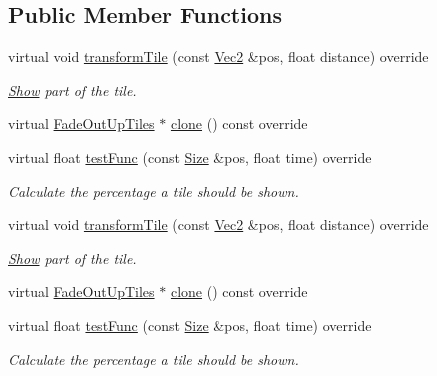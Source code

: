 \subsection*{Public Member Functions}
\begin{DoxyCompactItemize}
\item 
virtual void \hyperlink{classFadeOutUpTiles_a408548b6434137f3be0cb47fe43c2e2d}{transform\+Tile} (const \hyperlink{classVec2}{Vec2} \&pos, float distance) override
\begin{DoxyCompactList}\small\item\em \hyperlink{classShow}{Show} part of the tile. \end{DoxyCompactList}\item 
virtual \hyperlink{classFadeOutUpTiles}{Fade\+Out\+Up\+Tiles} $\ast$ \hyperlink{classFadeOutUpTiles_aa408cee44da1d5e8ebb41063d58a0de9}{clone} () const override
\item 
virtual float \hyperlink{classFadeOutUpTiles_a8a0a0c36e5c02a518dc649b2ec7d8864}{test\+Func} (const \hyperlink{classSize}{Size} \&pos, float time) override
\begin{DoxyCompactList}\small\item\em Calculate the percentage a tile should be shown. \end{DoxyCompactList}\item 
virtual void \hyperlink{classFadeOutUpTiles_a00c6d04f5b87f24d43dbc6a18dc96670}{transform\+Tile} (const \hyperlink{classVec2}{Vec2} \&pos, float distance) override
\begin{DoxyCompactList}\small\item\em \hyperlink{classShow}{Show} part of the tile. \end{DoxyCompactList}\item 
virtual \hyperlink{classFadeOutUpTiles}{Fade\+Out\+Up\+Tiles} $\ast$ \hyperlink{classFadeOutUpTiles_af0311f93b8155bb8cd59db4320d630a0}{clone} () const override
\item 
virtual float \hyperlink{classFadeOutUpTiles_ac01a15f89dca9a3a4c1585031abf6d2c}{test\+Func} (const \hyperlink{classSize}{Size} \&pos, float time) override
\begin{DoxyCompactList}\small\item\em Calculate the percentage a tile should be shown. \end{DoxyCompactList}\end{DoxyCompactItemize}
